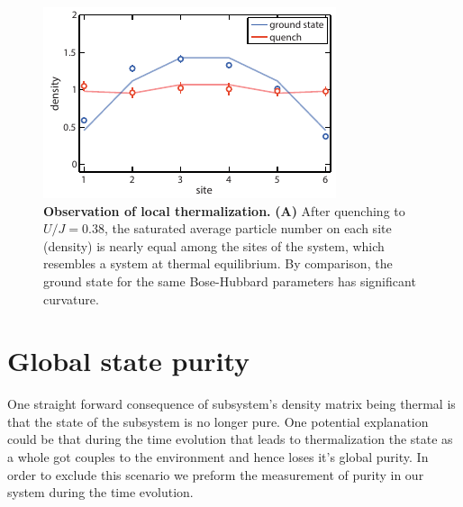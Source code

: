  \begin{figure}[t!]
	\centering
	\includegraphics[scale=1.5]{figures/ETH_density.pdf}
	\caption{{\bf Observation of local thermalization.} {\bf(A)} After quenching to $U/J=0.38$, the saturated average particle number on each site (density) is nearly equal among the sites of the system, which resembles a system at thermal equilibrium. By comparison, the ground state for the same Bose-Hubbard parameters has significant curvature.}
	\label{fig:ETH_density}
\end{figure} 

\section{Global state purity}

One straight forward consequence of subsystem's density matrix being thermal is that the state of the subsystem is no longer pure. One potential explanation could be that during the time evolution that leads to thermalization the state as a whole got couples to the environment and hence loses it's global purity. In order to exclude this scenario we preform the measurement of purity in our system during the time evolution. 

